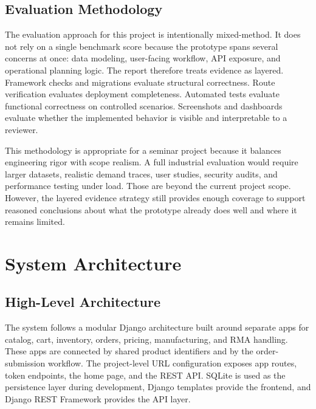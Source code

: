 \documentclass[12pt,letterpaper,oneside,openany]{book}
\begin{document}
\section{Evaluation Methodology}

\begin{justifying}
The evaluation approach for this project is intentionally mixed-method. It does
not rely on a single benchmark score because the prototype spans several
concerns at once: data modeling, user-facing workflow, API exposure, and
operational planning logic. The report therefore treats evidence as layered.
Framework checks and migrations evaluate structural correctness. Route
verification evaluates deployment completeness. Automated tests evaluate
functional correctness on controlled scenarios. Screenshots and dashboards
evaluate whether the implemented behavior is visible and interpretable to a
reviewer.
\end{justifying}

\begin{justifying}
This methodology is appropriate for a seminar project because it balances
engineering rigor with scope realism. A full industrial evaluation would
require larger datasets, realistic demand traces, user studies, security
audits, and performance testing under load. Those are beyond the current
project scope. However, the layered evidence strategy still provides enough
coverage to support reasoned conclusions about what the prototype already does
well and where it remains limited.
\end{justifying}

\chapter{System Architecture}

\section{High-Level Architecture}

\begin{justifying}
The system follows a modular Django architecture built around separate apps for
catalog, cart, inventory, orders, pricing, manufacturing, and RMA handling.
These apps are connected by shared product identifiers and by the
order-submission workflow. The project-level URL configuration exposes app
routes, token endpoints, the home page, and the REST API. SQLite is used as
the persistence layer during development, Django templates provide the
frontend, and Django REST Framework provides the API layer.
\end{justifying}
\end{document}
